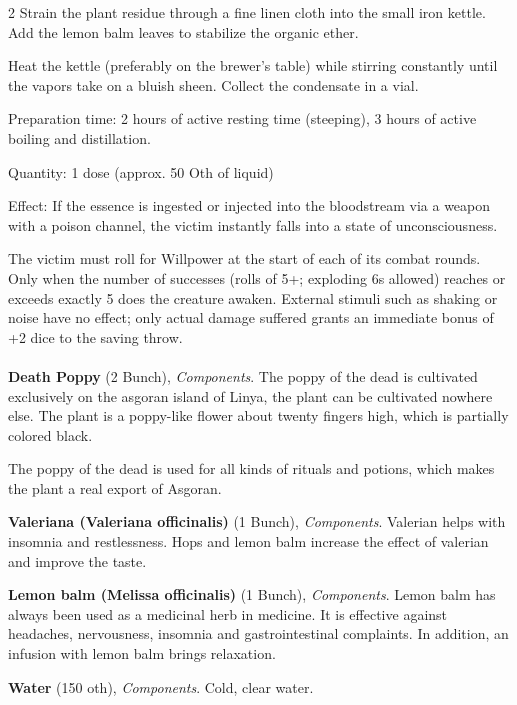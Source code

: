 \begin{multicols}{2}
Strain the plant residue through a fine linen cloth into the small iron kettle. Add the lemon balm leaves to stabilize the organic ether.

Heat the kettle (preferably on the brewer’s table) while stirring constantly until the vapors take on a bluish sheen. Collect the condensate in a vial.

Preparation time: 2 hours of active resting time (steeping), 3 hours of active boiling and distillation.

Quantity: 1 dose (approx. 50 Oth of liquid)

Effect: If the essence is ingested or injected into the bloodstream via a weapon with a poison channel, the victim instantly falls into a state of unconsciousness.

The victim must roll for Willpower at the start of each of its combat rounds. Only when the number of successes (rolls of 5+; exploding 6s allowed) reaches or exceeds exactly 5 does the creature awaken. External stimuli such as shaking or noise have no effect; only actual damage suffered grants an immediate bonus of +2 dice to the saving throw.

    \paragraph{}
    \begin{denseitemize}
        \item \textbf{Death Poppy} (2 Bunch), \textit{Components}.
        The poppy of the dead is cultivated exclusively on the asgoran island of Linya, the plant can be cultivated nowhere else. The plant is a poppy-like flower about twenty fingers high, which is partially colored black. 

The poppy of the dead is used for all kinds of rituals and potions, which makes the plant a real export of Asgoran.
        \item \textbf{Valeriana (Valeriana officinalis)} (1 Bunch), \textit{Components}.
        Valerian helps with insomnia and restlessness. Hops and lemon balm increase the effect of valerian and improve the taste.
        \item \textbf{Lemon balm (Melissa officinalis)} (1 Bunch), \textit{Components}.
        Lemon balm has always been used as a medicinal herb in medicine. It is effective against headaches, nervousness, insomnia and gastrointestinal complaints. In addition, an infusion with lemon balm brings relaxation.
        \item \textbf{Water} (150 oth), \textit{Components}.
        Cold, clear water.
    \end{denseitemize}



\end{multicols}
